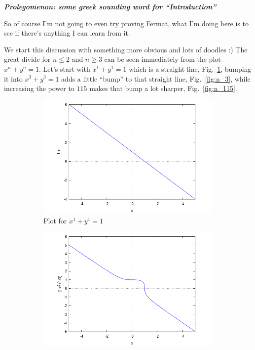 \documentclass[aps,preprint,preprintnumbers,nofootinbib,showpacs,prd]{revtex4-1}
\begin{document}
\bigskip\textbf{\textit{Prolegomenon: some greek sounding word for ``Introduction''}}

So of course I'm not going to even try proving Fermat, what I'm doing here is to see if there's anything I can learn from it.

We start this discussion with something more obvious and lots of doodles :) The great divide for $n \le 2$ and $n \ge 3$ can be seen immediately from the plot $x^n + y^n = 1$. Let's start with $x^1 + y^1 = 1$ which is a straight line, Fig.~\ref{fig:n_1}, bumping it into $x^3 + y^3 = 1$ adds a little ``bump'' to that straight line, Fig.~\ref{fig:n_3}, while increasing the power to $115$ makes that bump a lot sharper, Fig.~\ref{fig:n_115}.
%
\begin{figure}
\centering
\begin{subfigure}{.33\textwidth}
  \centering
  \includegraphics[width=1.1\linewidth]{FLT_n_1.png}
  \caption{Plot for $x^1 + y^1 = 1$}
  \label{fig:n_1}
\end{subfigure}%
\begin{subfigure}{.33\textwidth}
  \centering
  \includegraphics[width=1.1\linewidth]{FLT_n_3.png}

\end{subfigure}
\end{figure}
\end{document}
